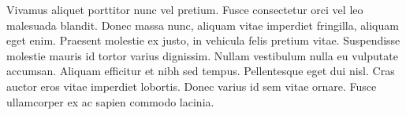 Vivamus aliquet porttitor nunc vel pretium. Fusce consectetur orci vel leo malesuada blandit. Donec massa nunc, aliquam vitae imperdiet fringilla, aliquam eget enim. Praesent molestie ex justo, in vehicula felis pretium vitae. Suspendisse molestie mauris id tortor varius dignissim. Nullam vestibulum nulla eu vulputate accumsan. Aliquam efficitur et nibh sed tempus. Pellentesque eget dui nisl. Cras auctor eros vitae imperdiet lobortis. Donec varius id sem vitae ornare. Fusce ullamcorper ex ac sapien commodo lacinia.